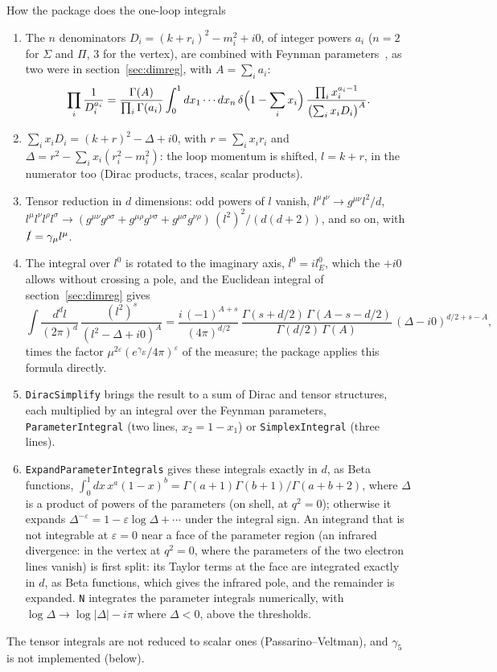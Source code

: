 \documentclass[11pt,a4paper]{article}
\newcommand{\pkg}[1]{\texttt{#1}}
\begin{document}
\begin{methodbox}{How the package does the one-loop integrals}
\begin{enumerate}[leftmargin=1.6em, itemsep=1pt, topsep=2pt, label=(\arabic*)]
\item The $n$ denominators $D_i=(k+r_i)^2-m_i^2+i0$, of integer powers $a_i$ ($n=2$ for $\Sigma$ and $\Pi$, 3 for the
  vertex), are combined with Feynman parameters~\cite{Feynman1949}, as two were in section~\ref{sec:dimreg}, with
  $A=\sum_ia_i$:
\[
\prod_i\frac1{D_i^{a_i}}=\frac{\Gamma(A)}{\prod_i\Gamma(a_i)}\int_0^1dx_1\cdots dx_n\,\delta\Bigl(1-\sum_ix_i\Bigr)\,
\frac{\prod_ix_i^{a_i-1}}{\bigl(\sum_ix_iD_i\bigr)^A} .
\]
\item $\sum_ix_iD_i=(k+r)^2-\Delta+i0$, with $r=\sum_ix_ir_i$ and $\Delta=r^2-\sum_ix_i(r_i^2-m_i^2)$: the loop momentum
  is shifted, $l=k+r$, in the numerator too (Dirac products, traces, scalar products).
\item Tensor reduction in $d$ dimensions: odd powers of $l$ vanish, $l^\mu l^\nu\to g^{\mu\nu}l^2/d$,
  $l^\mu l^\nu l^\rho l^\sigma\to(g^{\mu\nu}g^{\rho\sigma}+g^{\mu\rho}g^{\nu\sigma}+g^{\mu\sigma}g^{\nu\rho})\,(l^2)^2/(d(d+2))$,
  and so on, with $\slashed{l}=\gamma_\mu l^\mu$.
\item The integral over $l^0$ is rotated to the imaginary axis, $l^0=il^0_E$, which the $+i0$ allows without crossing a
  pole, and the Euclidean integral of section~\ref{sec:dimreg} gives~\cite[appendix~A.4]{PeskinSchroeder}
\[
\int\frac{d^dl}{(2\pi)^d}\,\frac{(l^2)^s}{(l^2-\Delta+i0)^A}=\frac{i\,(-1)^{A+s}}{(4\pi)^{d/2}}\,
\frac{\Gamma(s+d/2)\,\Gamma(A-s-d/2)}{\Gamma(d/2)\,\Gamma(A)}\,(\Delta-i0)^{d/2+s-A},
\]
  times the factor $\mu^{2\varepsilon}(e^{\gamma_E}/4\pi)^\varepsilon$ of the measure; the package applies this formula
  directly.
\item \pkg{DiracSimplify} brings the result to a sum of Dirac and tensor structures, each multiplied by an integral over the
  Feynman parameters, \pkg{ParameterIntegral} (two lines, $x_2=1-x_1$) or \pkg{SimplexIntegral} (three lines).
\item \pkg{ExpandParameterIntegrals} gives these integrals exactly in $d$, as Beta functions,
  $\int_0^1dx\,x^a(1-x)^b=\Gamma(a+1)\Gamma(b+1)/\Gamma(a+b+2)$, where $\Delta$ is a product of powers of the parameters (on
  shell, at $q^2=0$); otherwise it expands $\Delta^{-\varepsilon}=1-\varepsilon\log\Delta+\cdots$ under the integral sign. An
  integrand that is not integrable at $\varepsilon=0$ near a face of the parameter region (an infrared divergence: in the
  vertex at $q^2=0$, where the parameters of the two electron lines vanish) is first split: its Taylor terms at the face
  are integrated exactly in $d$, as Beta functions, which gives the infrared pole, and the remainder is expanded.
  \pkg{N} integrates the parameter integrals numerically, with $\log\Delta\to\log|\Delta|-i\pi$ where $\Delta<0$, above
  the thresholds.
\end{enumerate}
The tensor integrals are not reduced to scalar ones (Passarino--Veltman), and $\gamma_5$ is not implemented (below).
\end{methodbox}
\end{document}
